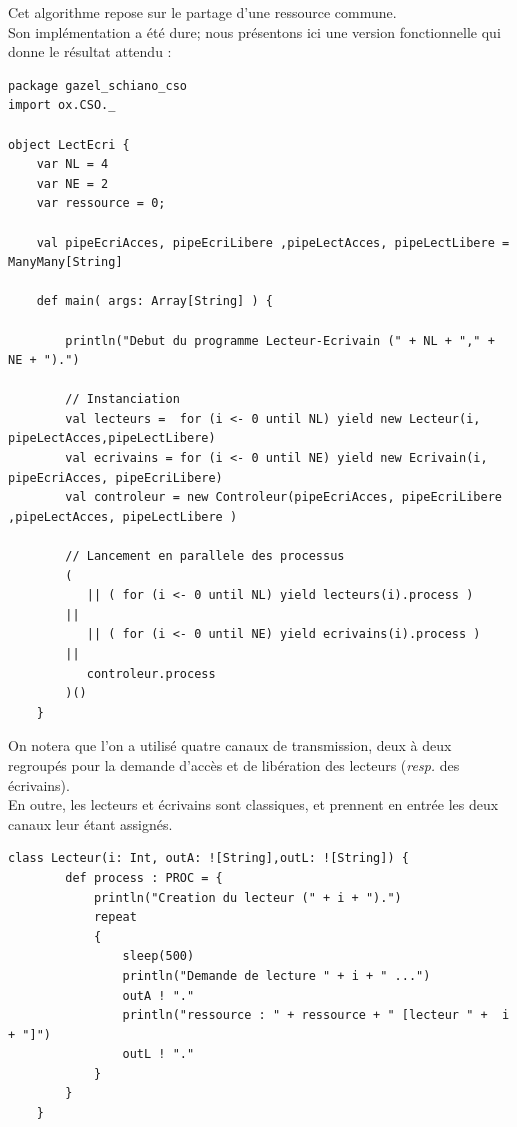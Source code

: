 \documentclass[a4paper,11pt,french]{report}
\begin{document}
Cet algorithme repose sur le partage d'une ressource commune.\\
Son implémentation a été dure; nous présentons ici une version fonctionnelle qui donne le résultat attendu :

\begin{lstlisting}[frame=trBL, title="Lecteur-\'Ecrivain"]
package gazel_schiano_cso
import ox.CSO._

object LectEcri {
    var NL = 4
    var NE = 2
    var ressource = 0;
    
    val pipeEcriAcces, pipeEcriLibere ,pipeLectAcces, pipeLectLibere = ManyMany[String]
    
    def main( args: Array[String] ) {
        
        println("Debut du programme Lecteur-Ecrivain (" + NL + "," + NE + ").")
        
        // Instanciation
        val lecteurs =  for (i <- 0 until NL) yield new Lecteur(i, pipeLectAcces,pipeLectLibere)
        val ecrivains = for (i <- 0 until NE) yield new Ecrivain(i, pipeEcriAcces, pipeEcriLibere)
        val controleur = new Controleur(pipeEcriAcces, pipeEcriLibere ,pipeLectAcces, pipeLectLibere )
        
        // Lancement en parallele des processus
        ( 
           || ( for (i <- 0 until NL) yield lecteurs(i).process )
        || 
           || ( for (i <- 0 until NE) yield ecrivains(i).process )
        || 
           controleur.process 
        )()
    }
\end{lstlisting}

On notera que l'on a utilisé quatre canaux de transmission, deux à deux regroupés pour la demande d'accès et de libération des lecteurs (\emph{resp.} des écrivains).\\

En outre, les lecteurs et écrivains sont classiques, et prennent en entrée les deux canaux leur étant assignés.\\

\begin{lstlisting}[frame=trBL, title="Lecteur-\'Ecrivain : Lecteur", firstnumber=last]
	class Lecteur(i: Int, outA: ![String],outL: ![String]) {
        def process : PROC = {
            println("Creation du lecteur (" + i + ").")
            repeat 
            {
                sleep(500)
                println("Demande de lecture " + i + " ...")
                outA ! "."
                println("ressource : " + ressource + " [lecteur " +  i + "]")
                outL ! "."
            }
        }
    }
\end{lstlisting}
\end{document}
